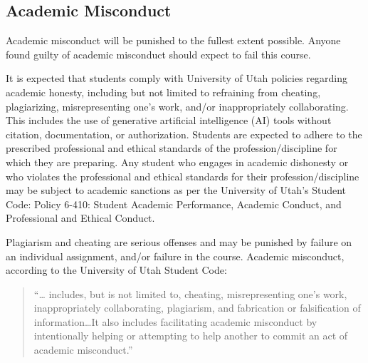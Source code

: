 \documentclass[
  letterpaper,
]{article}
\begin{document}
\hypertarget{academic-misconduct}{%
\subsection{Academic Misconduct}\label{academic-misconduct}}

\begin{tcolorbox}[enhanced jigsaw, bottomrule=.15mm, leftrule=.75mm, toptitle=1mm, titlerule=0mm, breakable, toprule=.15mm, opacityback=0, colbacktitle=quarto-callout-warning-color!10!white, colback=white, title=\textcolor{quarto-callout-warning-color}{\faExclamationTriangle}\hspace{0.5em}{Warning}, bottomtitle=1mm, arc=.35mm, rightrule=.15mm, coltitle=black, colframe=quarto-callout-warning-color-frame, left=2mm, opacitybacktitle=0.6]

Academic misconduct will be punished to the fullest extent possible.
Anyone found guilty of academic misconduct should expect to fail this
course.

\end{tcolorbox}

It is expected that students comply with University of Utah policies
regarding academic honesty, including but not limited to refraining from
cheating, plagiarizing, misrepresenting one's work, and/or
inappropriately collaborating. This includes the use of generative
artificial intelligence (AI) tools without citation, documentation, or
authorization. Students are expected to adhere to the prescribed
professional and ethical standards of the profession/discipline for
which they are preparing. Any student who engages in academic dishonesty
or who violates the professional and ethical standards for their
profession/discipline may be subject to academic sanctions as per the
University of Utah's Student Code: Policy 6-410: Student Academic
Performance, Academic Conduct, and Professional and Ethical Conduct.

Plagiarism and cheating are serious offenses and may be punished by
failure on an individual assignment, and/or failure in the course.
Academic misconduct, according to the University of Utah Student Code:

\begin{quote}
``\ldots{} includes, but is not limited to, cheating, misrepresenting
one's work, inappropriately collaborating, plagiarism, and fabrication
or falsification of information\ldots It also includes facilitating
academic misconduct by intentionally helping or attempting to help
another to commit an act of academic misconduct.''
\end{quote}
\end{document}
